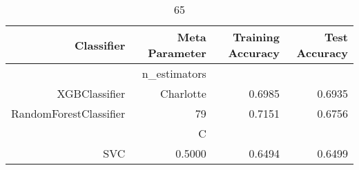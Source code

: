 
\begin{table}[H]
    \caption{65}
    \centering
    \begin{tabular}{|r|r|r|r|}
        \hline
        Classifier &Meta Parameter &Training Accuracy
        &Test Accuracy\\
        \hline
        &n\_estimators &\multicolumn{2}{|r|}{}\\
        \hline
        XGBClassifier &Charlotte &0.6985 &0.6935\\
        \hline
        RandomForestClassifier &79 &0.7151 &0.6756\\
        \hline
        &C &\multicolumn{2}{|r|}{}\\
        \hline
        SVC &0.5000 &0.6494 &0.6499\\
        \hline
    \end{tabular}
\end{table}
